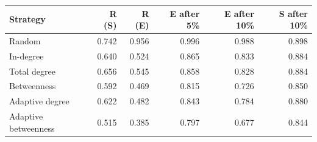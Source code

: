 
\begin{tabular}{lrrrrr}
\toprule
Strategy & R (S) & R (E) & E after 5\% & E after 10\% & S after 10\%\\
\midrule
Random & 0.742 & 0.956 & 0.996 & 0.988 & 0.898\\
In-degree & 0.640 & 0.524 & 0.865 & 0.833 & 0.884\\
Total degree & 0.656 & 0.545 & 0.858 & 0.828 & 0.884\\
Betweenness & 0.592 & 0.469 & 0.815 & 0.726 & 0.850\\
Adaptive degree & 0.622 & 0.482 & 0.843 & 0.784 & 0.880\\
Adaptive betweenness & 0.515 & 0.385 & 0.797 & 0.677 & 0.844\\
\bottomrule
\end{tabular}
